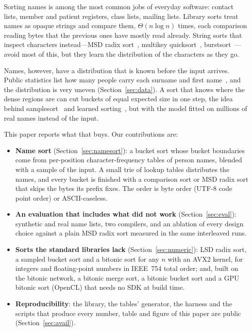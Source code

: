 \documentclass[11pt]{article}
\theoremstyle{definition}
\begin{document}
Sorting names is among the most common jobs of everyday software: contact
lists, member and patient registers, class lists, mailing lists. Library
sorts treat names as opaque strings and compare them,
$\Theta(n \log n)$ times, each comparison reading bytes that the previous
ones have mostly read already. String sorts that inspect characters
instead---MSD radix sort~\cite{mcilroy1993radix,karkkainen2008radix},
multikey quicksort~\cite{bentley1997strings},
burstsort~\cite{sinha2004burstsort}---avoid most of this, but they learn the
distribution of the characters as they go.

Names, however, have a distribution that is known before the input arrives.
Public statistics list how many people carry each surname and first
name~\cite{census2010,census1990}, and the distribution is very uneven
(Section~\ref{sec:data}). A sort that knows where the dense regions are can
cut buckets of equal expected size in one step, the idea behind
samplesort~\cite{frazer1970samplesort,sanders2004superscalar,axtmann2017ips4o}
and learned sorting~\cite{kristo2020learned}, but with the model fitted on
millions of real names instead of the input.

This paper reports what that buys. Our contributions are:
\begin{itemize}
\item \textbf{Name sort} (Section~\ref{sec:namesort}): a bucket sort whose
  bucket boundaries come from per-position character-frequency tables of
  person names, blended with a sample of the input. A small trie of lookup
  tables distributes the names, and every bucket is finished with a
  comparison sort or MSD radix sort that skips the bytes its prefix fixes.
  The order is byte order (UTF-8 code point order) or ASCII-caseless.
\item \textbf{An evaluation that includes what did not work}
  (Section~\ref{sec:eval}): synthetic and real name lists, two compilers, and
  an ablation of every design choice against a plain MSD radix sort measured
  in the same interleaved runs.
\item \textbf{Sorts the standard libraries lack}
  (Section~\ref{sec:numeric}): LSD radix sort, a sampled bucket sort and a
  bitonic sort for any $n$ with an AVX2 kernel, for integers and
  floating-point numbers in IEEE~754 total order; and, built on the bitonic
  network, a bitonic merge sort, a bitonic bucket sort and a GPU bitonic sort
  (OpenCL) that needs no SDK at build time.
\item \textbf{Reproducibility}: the library, the tables' generator, the
  harness and the scripts that produce every number, table and figure of
  this paper are public (Section~\ref{sec:avail}).
\end{itemize}
\end{document}
